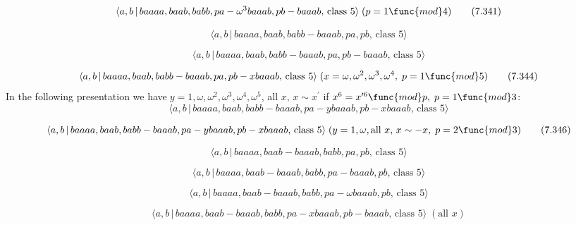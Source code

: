 \documentclass[10pt]{article}
\begin{document}
\begin{equation}
\langle a,b\,|\,baaaa,baab,babb,pa-\omega ^{3}baaab,pb-baaab,\,\text{class }%
5\rangle \;(p=1\func{mod}4)  \tag{7.341}
\end{equation}

\begin{equation}
\langle a,b\,|\,baaaa,baab,babb-baaab,pa,pb,\,\text{class }5\rangle 
\tag{7.342}
\end{equation}

\begin{equation}
\langle a,b\,|\,baaaa,baab,babb-baaab,pa,pb-baaab,\,\text{class }5\rangle 
\tag{7.343}
\end{equation}

\begin{equation}
\langle a,b\,|\,baaaa,baab,babb-baaab,pa,pb-xbaaab,\,\text{class }5\rangle
\;(x=\omega ,\omega ^{2},\omega ^{3},\omega ^{4},\;p=1\func{mod}5) 
\tag{7.344}
\end{equation}%
In the following presentation we have$\;y=1,\omega ,\omega ^{2},\omega
^{3},\omega ^{4},\omega ^{5}$, all $x,\,x\sim x^{\prime }$ if $%
x^{6}=x^{\prime 6}\func{mod}p,\;p=1\func{mod}3$:%
\begin{equation}
\langle a,b\,|\,baaaa,baab,babb-baaab,pa-ybaaab,pb-xbaaab,\,\text{class }%
5\rangle  \tag{7.345}
\end{equation}

\begin{equation}
\langle a,b\,|\,baaaa,baab,babb-baaab,pa-ybaaab,pb-xbaaab,\,\text{class }%
5\rangle \;(y=1,\omega ,\text{all }x,\,x\sim -x,\;p=2\func{mod}3) 
\tag{7.346}
\end{equation}

\begin{equation}
\langle a,b\,|\,baaaa,baab-baaab,babb,pa,pb,\,\text{class }5\rangle 
\tag{7.347}
\end{equation}

\begin{equation}
\langle a,b\,|\,baaaa,baab-baaab,babb,pa-baaab,pb,\,\text{class }5\rangle 
\tag{7.348}
\end{equation}

\begin{equation}
\langle a,b\,|\,baaaa,baab-baaab,babb,pa-\omega baaab,pb,\,\text{class }%
5\rangle  \tag{7.349}
\end{equation}

\begin{equation}
\langle a,b\,|\,baaaa,baab-baaab,babb,pa-xbaaab,pb-baaab,\,\text{class }%
5\rangle \;(\text{all }x)  \tag{7.350}
\end{equation}
\end{document}
